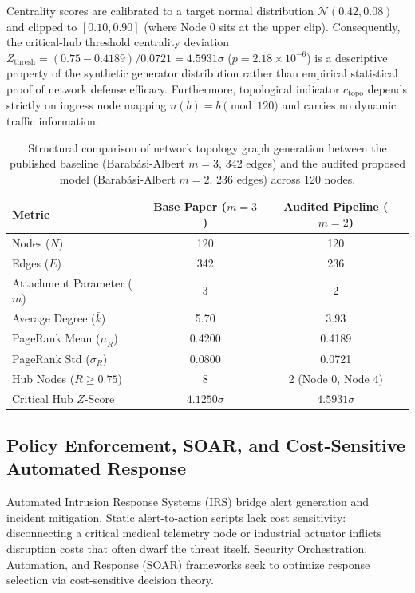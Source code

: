 \documentclass[journal,10pt,onecolumn]{IEEEtran}
\begin{document}
Centrality scores are calibrated to a target normal distribution $\mathcal{N}(0.42, 0.08)$ and clipped to $[0.10, 0.90]$ (where Node 0 sits at the upper clip). Consequently, the critical-hub threshold centrality deviation $Z_{\text{thresh}} = (0.75 - 0.4189)/0.0721 = 4.5931\sigma$ ($p = 2.18 \times 10^{-6}$) is a descriptive property of the synthetic generator distribution rather than empirical statistical proof of network defense efficacy. Furthermore, topological indicator $c_{\text{topo}}$ depends strictly on ingress node mapping $n(b) = b \pmod{120}$ and carries no dynamic traffic information.

\begin{table}[t]
\caption{Structural comparison of network topology graph generation between the published baseline \cite{1} (Barabási-Albert $m=3$, 342 edges) and the audited proposed model (Barabási-Albert $m=2$, 236 edges) across 120 nodes.}
\label{tab:topo_comparison}
\centering
\small
\begin{tabular}{lcc}
\toprule
\textbf{Metric} & \textbf{Base Paper \cite{1} ($m=3$)} & \textbf{Audited Pipeline ($m=2$)} \\
\midrule
Nodes ($N$) & 120 & 120 \\
Edges ($E$) & 342 & 236 \\
Attachment Parameter ($m$) & 3 & 2 \\
Average Degree ($\bar{k}$) & 5.70 & 3.93 \\
PageRank Mean ($\mu_R$) & 0.4200 & 0.4189 \\
PageRank Std ($\sigma_R$) & 0.0800 & 0.0721 \\
Hub Nodes ($R \ge 0.75$) & 8 & 2 (Node 0, Node 4) \\
Critical Hub $Z$-Score & $4.1250\sigma$ & $4.5931\sigma$ \\
\bottomrule
\end{tabular}
\end{table}

\subsection{Policy Enforcement, SOAR, and Cost-Sensitive Automated Response}
Automated Intrusion Response Systems (IRS) bridge alert generation and incident mitigation. Static alert-to-action scripts lack cost sensitivity: disconnecting a critical medical telemetry node or industrial actuator inflicts disruption costs that often dwarf the threat itself. Security Orchestration, Automation, and Response (SOAR) frameworks seek to optimize response selection via cost-sensitive decision theory.
\end{document}
